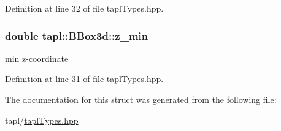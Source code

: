 Definition at line 32 of file tapl\+Types.\+hpp.

\subsubsection[{\texorpdfstring{z\+\_\+min}{z_min}}]{\setlength{\rightskip}{0pt plus 5cm}double tapl\+::\+B\+Box3d\+::z\+\_\+min}\hypertarget{structtapl_1_1BBox3d_a62b2d92bf15298ad86a7159aadd232ab}{}\label{structtapl_1_1BBox3d_a62b2d92bf15298ad86a7159aadd232ab}
min z-\/coordinate 

Definition at line 31 of file tapl\+Types.\+hpp.



The documentation for this struct was generated from the following file\+:\begin{DoxyCompactItemize}
\item 
tapl/\hyperlink{taplTypes_8hpp}{tapl\+Types.\+hpp}\end{DoxyCompactItemize}
